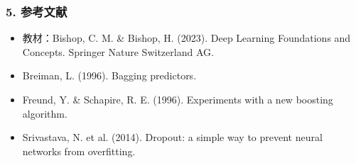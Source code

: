 \documentclass[t,aspectratio=169]{beamer} %
\begin{document}
\begin{frame}
    \frametitle{5. 参考文献}
    \begin{itemize}
        \item 教材：Bishop, C. M. \& Bishop, H. (2023). Deep Learning Foundations and Concepts. Springer Nature Switzerland AG.
        \item Breiman, L. (1996). Bagging predictors.
        \item Freund, Y. \& Schapire, R. E. (1996). Experiments with a new boosting algorithm.
        \item Srivastava, N. et al. (2014). Dropout: a simple way to prevent neural networks from overfitting.
    \end{itemize}
\end{frame}
\end{document}
